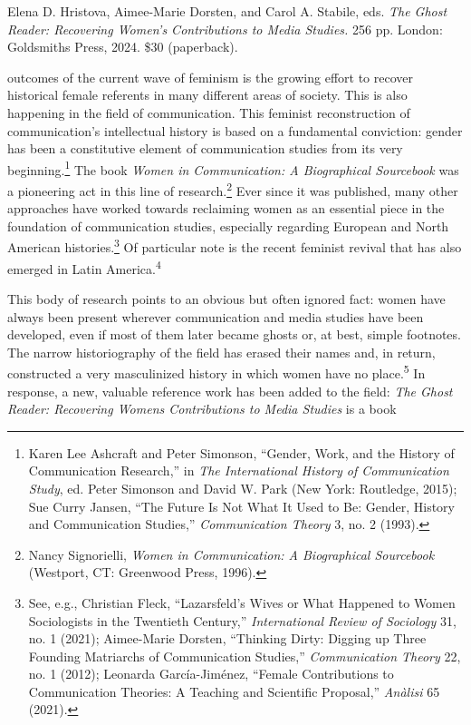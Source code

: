 \documentclass{tufte-handout}
\begin{document}
\begin{titlepage}
\noindent Elena D. Hristova, Aimee-Marie Dorsten, and Carol A.
Stabile, eds. \emph{The Ghost Reader: Recovering
Women's Contributions to Media Studies.} 256 pp.
London: Goldsmiths Press, 2024. \$30 (paperback).

\vspace{1em}

 outcomes of the current wave of feminism is the growing
effort to recover historical female referents in many different areas of
society. This is also happening in the field of communication. This
feminist reconstruction of communication's intellectual history is based
on a fundamental conviction: gender has been a constitutive element of
communication studies from its very beginning.\footnote{Karen Lee
  Ashcraft and Peter Simonson, ``Gender, Work, and the History of
  Communication Research,'' in \emph{The International History of
  Communication Study}, ed. Peter Simonson and David W. Park (New York:
  Routledge, 2015); Sue Curry Jansen, ``The Future Is Not What It Used
  to Be: Gender, History and Communication Studies,''
  \emph{Communication Theory} 3, no. 2 (1993).} The book \emph{Women in
Communication: A Biographical Sourcebook} was a pioneering act in this
line of research.\footnote{Nancy Signorielli, \emph{Women in
  Communication: A Biographical Sourcebook} (Westport, CT: Greenwood
  Press, 1996).} Ever since it was published, many other approaches have
worked towards reclaiming women as an essential piece in the foundation
of communication studies,  especially regarding European and North
American histories.\footnote{See, e.g., Christian Fleck, ``Lazarsfeld's
  Wives or What Happened to Women Sociologists in the Twentieth
  Century,'' \emph{International Review of Sociology} 31, no. 1 (2021);
  Aimee-Marie Dorsten, ``Thinking Dirty: Digging up Three Founding
  Matriarchs of Communication Studies,'' \emph{Communication Theory} 22,
  no. 1 (2012); Leonarda García-Jiménez, ``Female Contributions to
  Communication Theories: A Teaching and Scientific Proposal,''
  \emph{Anàlisi} 65 (2021).} Of particular note is the recent feminist
revival that has also emerged in Latin America.\textsuperscript{4}

  This body of research points to an obvious but often ignored fact: women
have always been present wherever communication and media studies have
been developed, even if most of them later became ghosts or, at best,
simple footnotes. The narrow historiography of the field has erased
their names and, in return, constructed a very masculinized history in
which women have no place.\textsuperscript{5} In
response, a new, valuable reference work has been added to the field: \emph{The Ghost Reader: Recovering Women\textquotesingle s Contributions
to Media Studies} is a book

\enlargethispage{2\baselineskip}

\vspace*{2em}



 \end{titlepage}
\end{document}
